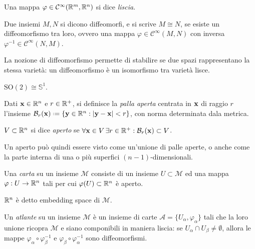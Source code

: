 \begin{definition}
	Una mappa $ \varphi \in \mathcal{C}^{\infty}(\mathbb{R}^m,\mathbb{R}^n) $ si dice \textit{liscia}.
\end{definition}

\begin{definition}
	Due insiemi $ M,N $ si dicono diffeomorfi, e si scrive $ M \cong N $, se esiste un diffeomorfismo tra loro, ovvero una mappa $ \varphi \in \mathcal{C}^{\infty}(M,N) $ con inversa $ \varphi^{-1} \in \mathcal{C}^{\infty}(N,M) $.
\end{definition}

La nozione di diffeomorfismo permette di stabilire se due spazi rappresentano la stessa varietà: un diffeomorfismo è un isomorfismo tra varietà lisce.

\begin{example}
	$ \text{SO}(2) \cong \mathbb{S}^1 $.
\end{example}

\begin{definition}
	Dati $ \mathbf{x} \in \mathbb{R}^n $ e $ r \in \mathbb{R}^+ $, si definisce la \textit{palla aperta} centrata in $ \mathbf{x} $ di raggio $ r $ l'insieme $ \mathcal{B}_r(\ve{x}) \defeq \{ \ve{y} \in \R^n : \abs{\ve{y} - \ve{x}} < r \} $, con norma determinata dala metrica.
\end{definition}

\begin{definition}
	$ V \subset \mathbb{R}^n $ si dice \textit{aperto} se $ \forall \mathbf{x} \in V \, \exists r \in \mathbb{R}^+ : \mathcal{B}_r(\mathbf{x}) \subset V $.
\end{definition}

Un aperto può quindi essere visto come un'unione di palle aperte, o anche come la parte interna di una o più superfici $ (n-1) $-dimensionali.

\begin{definition}
	Una \textit{carta} su un insieme $ \mathcal{M} $ consiste di un insieme $ U \subset \mathcal{M} $ ed una mappa $ \varphi : U \rightarrow \mathbb{R}^n $ tali per cui $ \varphi(U) \subset \mathbb{R}^n $ è aperto.
\end{definition}

$ \mathbb{R}^n $ è detto embedding space di $ \mathcal{M} $.

\begin{definition}
	Un \textit{atlante} su un insieme $ \mathcal{M} $ è un insieme di carte $ \mathcal{A} = \{U_{\alpha},\varphi_{\alpha}\} $ tali che la loro unione ricopra $ \mathcal{M} $ e siano componibili in maniera liscia: se $ U_{\alpha} \cap U_{\beta} \neq \emptyset $, allora le mappe $ \varphi_{\alpha} \circ \varphi_{\beta}^{-1} $ e $ \varphi_{\beta} \circ \varphi_{\alpha}^{-1} $ sono diffeomorfismi.
\end{definition}

